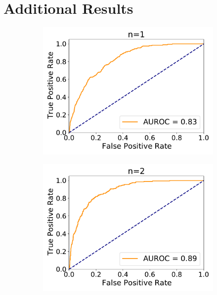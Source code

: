 \chapter{Additional Results}
\begin{figure}[htb]
	\begin{subfigure}{.33\textwidth}
		\centering
		\includegraphics[width=1\linewidth]{figures/roc_exactUpdate/AUROC_2000samples_class0_llh_n1}
		\caption{}
		\label{fig:roc_exact_n1}
	\end{subfigure}%
	\begin{subfigure}{.33\textwidth}
		\centering
		\includegraphics[width=1\linewidth]{figures/roc_exactUpdate/AUROC_2000samples_class0_llh_n2}
		\caption{}
		\label{fig:roc_exact_n2}

\end{subfigure}
\end{figure}
